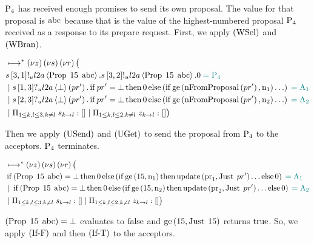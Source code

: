 $\Proposer{4}$ has received enough promises to send its own proposal.
The value for that proposal is $\ABC$ because that is the value of the highest-numbered proposal $\Proposer{4}$ received as a response to its prepare request.
First, we apply $\RWsel$ and $\RWbran$.

\begin{align*}
&\mapstostar \NuChannels \big (\\
&
    \SendUnreliableP{\ChannelS}{3}{1}{\LTwoA}{\ProposalC{15}{\ABC}}.
    \SendUnreliableP{\ChannelS}{3}{2}{\LTwoA}{\ProposalC{15}{\ABC}}.
    \End
    \comment{= \Proposer{4}}\\
&\Or
    \ReceiveUnreliableP{\ChannelS}{1}{3}{\LTwoA}{\bot}{pr'}.
    \If{pr' = \bot}
    \Then{\End}
    \Else{\Paren{
        \If{\greaterEqual{\nFromProposal{pr'}}{\NumberRegister_1}}\ldots
    }}
    \comment{= \Acceptor{1}}\\
&\Or
    \ReceiveUnreliableP{\ChannelS}{2}{3}{\LTwoA}{\bot}{pr'}.
    \If{pr' = \bot}
    \Then{\End}
    \Else{\Paren{
        \If{\greaterEqual{\nFromProposal{pr'}}{\NumberRegister_2}}\ldots
    }}
    \comment{= \Acceptor{2}}\\
&\Or \InnerSessionQueues{\ChannelS}
\Or \OuterSessionQueues
\big )
\end{align*}

Then we apply $\RUsend$ and $\RUget$ to send the proposal from $\Proposer{4}$ to the acceptors.
$\Proposer{4}$ terminates.

\begin{align*}
&\mapstostar \NuChannels \big (\\
&
    \If{\Paren{\ProposalC{15}{\ABC}} = \bot}
    \Then{\End}
    \Else{\Paren{
        \If{\greaterEqual{15}{\NumberRegister_1}}
        \Then{\update{\ProposalRegister_1}{\Just{pr'}}\ldots}
        \Else{\End}
    }}
    \comment{= \Acceptor{1}}\\
&\Or
    \If{\Paren{\ProposalC{15}{\ABC}} = \bot}
    \Then{\End}
    \Else{\Paren{
        \If{\greaterEqual{15}{\NumberRegister_2}}
        \Then{\update{\ProposalRegister_2}{\Just{pr'}}\ldots}
        \Else{\End}
    }}
    \comment{= \Acceptor{2}}\\
&\Or \InnerSessionQueues{\ChannelS}
\Or \OuterSessionQueues
\big )
\end{align*}

$\Paren{\ProposalC{15}{\ABC}} = \bot$ evaluates to $\False$ and $\greaterEqual{15}{\Just{15}}$ returns $\True$.
So, we apply $\RIfF$ and then $\RIfT$ to the acceptors.

